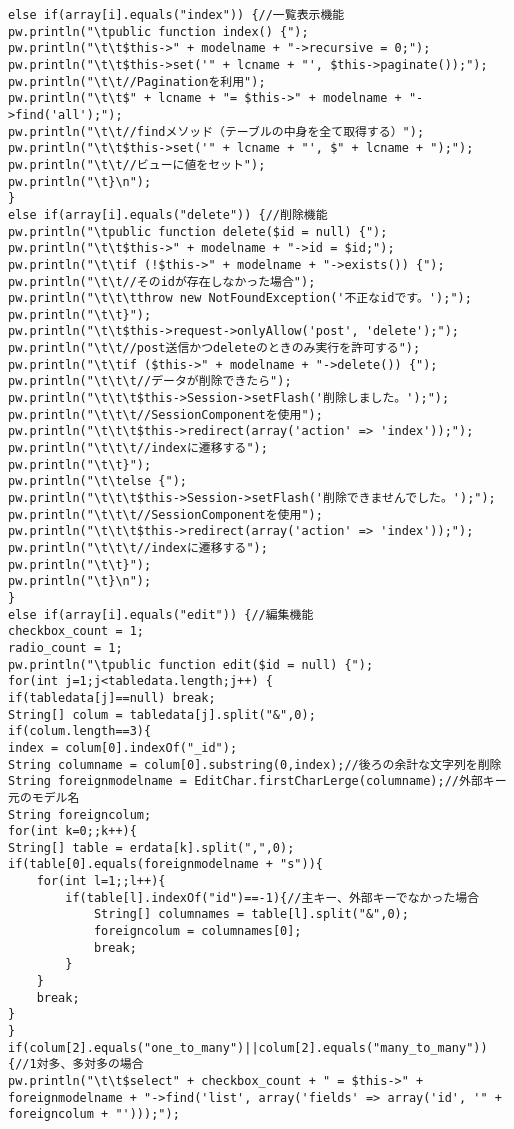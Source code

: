\documentclass{funthesis}
\begin{document}
\begin{lstlisting}[caption=WriteController .java,label=1]
else if(array[i].equals("index")) {//一覧表示機能
pw.println("\tpublic function index() {");
pw.println("\t\t$this->" + modelname + "->recursive = 0;");
pw.println("\t\t$this->set('" + lcname + "', $this->paginate());");
pw.println("\t\t//Paginationを利用");
pw.println("\t\t$" + lcname + "= $this->" + modelname + "->find('all');");
pw.println("\t\t//findメソッド（テーブルの中身を全て取得する）");
pw.println("\t\t$this->set('" + lcname + "', $" + lcname + ");");
pw.println("\t\t//ビューに値をセット");
pw.println("\t}\n");
}
else if(array[i].equals("delete")) {//削除機能
pw.println("\tpublic function delete($id = null) {");
pw.println("\t\t$this->" + modelname + "->id = $id;");
pw.println("\t\tif (!$this->" + modelname + "->exists()) {");
pw.println("\t\t//そのidが存在しなかった場合");
pw.println("\t\t\tthrow new NotFoundException('不正なidです。');");
pw.println("\t\t}");
pw.println("\t\t$this->request->onlyAllow('post', 'delete');");
pw.println("\t\t//post送信かつdeleteのときのみ実行を許可する");
pw.println("\t\tif ($this->" + modelname + "->delete()) {");
pw.println("\t\t\t//データが削除できたら");
pw.println("\t\t\t$this->Session->setFlash('削除しました。');");
pw.println("\t\t\t//SessionComponentを使用");
pw.println("\t\t\t$this->redirect(array('action' => 'index'));");
pw.println("\t\t\t//indexに遷移する");
pw.println("\t\t}");
pw.println("\t\telse {");
pw.println("\t\t\t$this->Session->setFlash('削除できませんでした。');");
pw.println("\t\t\t//SessionComponentを使用");
pw.println("\t\t\t$this->redirect(array('action' => 'index'));");
pw.println("\t\t\t//indexに遷移する");
pw.println("\t\t}");
pw.println("\t}\n");
}
else if(array[i].equals("edit")) {//編集機能
checkbox_count = 1;
radio_count = 1;
pw.println("\tpublic function edit($id = null) {");
for(int j=1;j<tabledata.length;j++) {
if(tabledata[j]==null) break;
String[] colum = tabledata[j].split("&",0);
if(colum.length==3){
index = colum[0].indexOf("_id");
String columname = colum[0].substring(0,index);//後ろの余計な文字列を削除
String foreignmodelname = EditChar.firstCharLerge(columname);//外部キー元のモデル名
String foreigncolum;
for(int k=0;;k++){
String[] table = erdata[k].split(",",0);
if(table[0].equals(foreignmodelname + "s")){
	for(int l=1;;l++){
		if(table[l].indexOf("id")==-1){//主キー、外部キーでなかった場合
			String[] columnames = table[l].split("&",0);
			foreigncolum = columnames[0];
			break;
		}
	}
	break;
}
}
if(colum[2].equals("one_to_many")||colum[2].equals("many_to_many")){//1対多、多対多の場合
pw.println("\t\t$select" + checkbox_count + " = $this->" + foreignmodelname + "->find('list', array('fields' => array('id', '" + foreigncolum + "')));");

\end{lstlisting}
\end{document}
